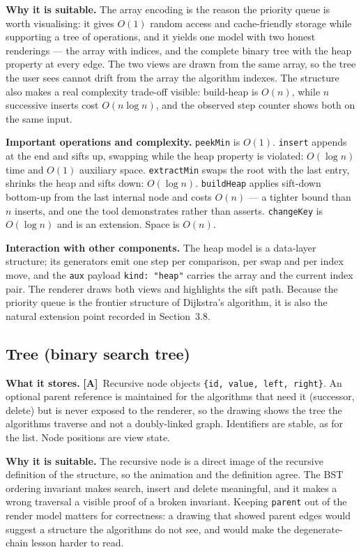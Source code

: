\documentclass[11pt,a4paper]{article}
\newcommand{\A}{\textcolor{asmc}{\textbf{[A]}}}     %
\newcommand{\ct}[1]{\texttt{#1}}
\begin{document}
\smallskip
\noindent\textbf{Why it is suitable.} The array encoding is the reason the priority queue is worth
visualising: it gives $O(1)$ random access and cache-friendly storage while supporting a tree of
operations, and it yields one model with two honest renderings --- the array with indices, and the
complete binary tree with the heap property at every edge. The two views are drawn from the same
array, so the tree the user sees cannot drift from the array the algorithm indexes. The structure
also makes a real complexity trade-off visible: build-heap is $O(n)$, while $n$ successive inserts
cost $O(n\log n)$, and the observed step counter shows both on the same input.

\smallskip
\noindent\textbf{Important operations and complexity.} \ct{peekMin} is $O(1)$. \ct{insert}
appends at the end and sifts up, swapping while the heap property is violated: $O(\log n)$ time
and $O(1)$ auxiliary space. \ct{extractMin} swaps the root with the last entry, shrinks the heap
and sifts down: $O(\log n)$. \ct{buildHeap} applies sift-down bottom-up from the last internal
node and costs $O(n)$ --- a tighter bound than $n$ inserts, and one the tool demonstrates rather
than asserts. \ct{changeKey} is $O(\log n)$ and is an extension. Space is $O(n)$.

\smallskip
\noindent\textbf{Interaction with other components.} The heap model is a data-layer structure; its
generators emit one step per comparison, per swap and per index move, and the \ct{aux} payload
\ct{kind: "heap"} carries the array and the current index pair. The renderer draws both views and
highlights the sift path. Because the priority queue is the frontier structure of Dijkstra's
algorithm, it is also the natural extension point recorded in Section~3.8.

\subsection{Tree (binary search tree)}

\noindent\textbf{What it stores.} \A\ Recursive node objects \ct{\{id, value, left, right\}}. An
optional parent reference is maintained for the algorithms that need it (successor, delete) but is
never exposed to the renderer, so the drawing shows the tree the algorithms traverse and not
a doubly-linked graph. Identifiers are stable, as for the list. Node positions are view state.

\smallskip
\noindent\textbf{Why it is suitable.} The recursive node is a direct image of the recursive
definition of the structure, so the animation and the definition agree. The BST ordering invariant
makes search, insert and delete meaningful, and it makes a wrong traversal a visible proof of a
broken invariant. Keeping \ct{parent} out of the render model matters for correctness: a drawing
that showed parent edges would suggest a structure the algorithms do not see, and would make the
degenerate-chain lesson harder to read.
\end{document}
